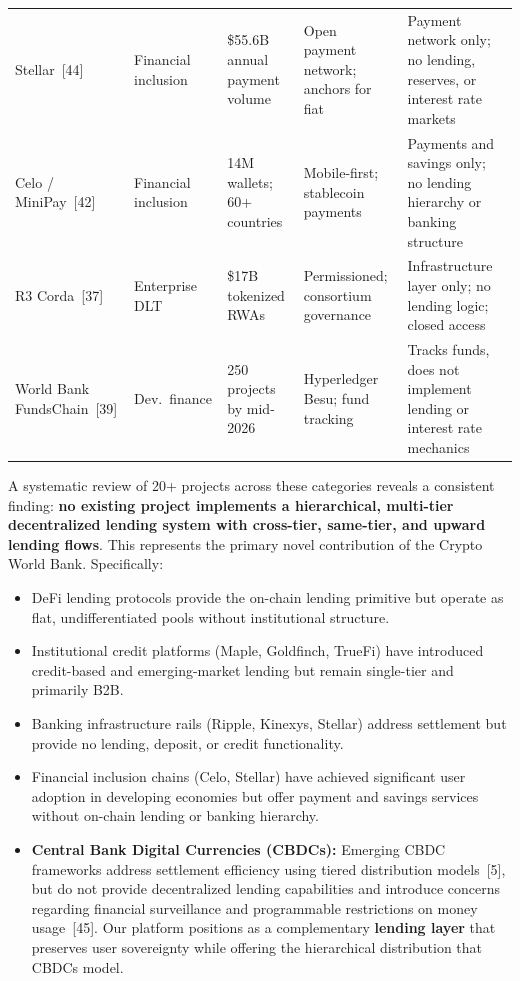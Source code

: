 \documentclass[12pt,a4paper]{report}
\begin{document}
\begin{longtable}{@{} >{\raggedright}p{2.2cm} >{\raggedright}p{2cm} >{\raggedright}p{2.5cm} >{\raggedright}p{2.5cm} >{\raggedright\arraybackslash}p{3cm} @{}}
\rowcolor{RowShade}
Stellar~[44] & Financial inclusion & \$55.6B annual payment volume & Open payment network; anchors for fiat & Payment network only; no lending, reserves, or interest rate markets \\
Celo / MiniPay~[42] & Financial inclusion & 14M wallets; 60+ countries & Mobile-first; stablecoin payments & Payments and savings only; no lending hierarchy or banking structure \\
\rowcolor{RowShade}
R3 Corda~[37] & Enterprise DLT & \$17B tokenized RWAs & Permissioned; consortium governance & Infrastructure layer only; no lending logic; closed access \\
World Bank FundsChain~[39] & Dev.\ finance & 250 projects by mid-2026 & Hyperledger Besu; fund tracking & Tracks funds, does not implement lending or interest rate mechanics \\
\end{longtable}

A systematic review of 20+ projects across these categories reveals a consistent finding: \textbf{no existing project implements a hierarchical, multi-tier decentralized lending system with cross-tier, same-tier, and upward lending flows}. This represents the primary novel contribution of the Crypto World Bank. Specifically:

\begin{itemize}[noitemsep]
\item DeFi lending protocols provide the on-chain lending primitive but operate as flat, undifferentiated pools without institutional structure.
\item Institutional credit platforms (Maple, Goldfinch, TrueFi) have introduced credit-based and emerging-market lending but remain single-tier and primarily B2B.
\item Banking infrastructure rails (Ripple, Kinexys, Stellar) address settlement but provide no lending, deposit, or credit functionality.
\item Financial inclusion chains (Celo, Stellar) have achieved significant user adoption in developing economies but offer payment and savings services without on-chain lending or banking hierarchy.
\item \textbf{Central Bank Digital Currencies (CBDCs):} Emerging CBDC frameworks address settlement efficiency using tiered distribution models~[5], but do not provide decentralized lending capabilities and introduce concerns regarding financial surveillance and programmable restrictions on money usage~[45]. Our platform positions as a complementary \textbf{lending layer} that preserves user sovereignty while offering the hierarchical distribution that CBDCs model.
\end{itemize}
\end{document}
